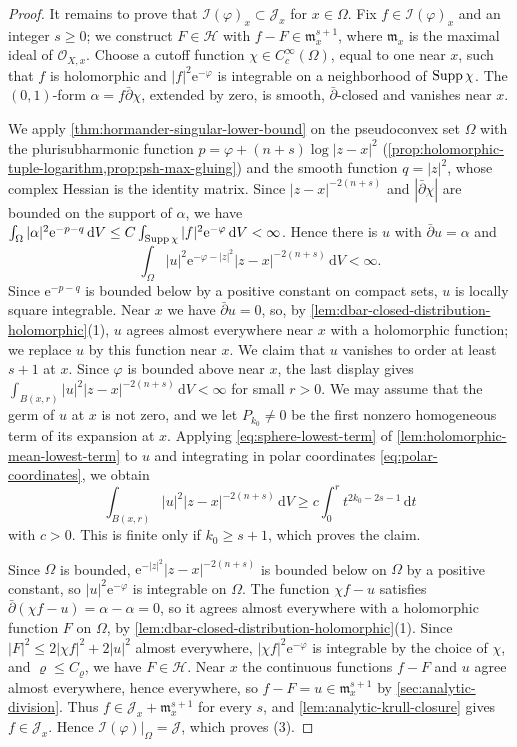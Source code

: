 \begin{proof}
It remains to prove that $\mathcal I(\varphi)_x\subset\mathcal J_x$ for $x\in\Omega$. Fix $f\in\mathcal I(\varphi)_x$ and an integer $s\geq0$; we construct $F\in\mathcal H$ with $f-F\in\mathfrak m_x^{s+1}$, where $\mathfrak m_x$ is the maximal ideal of $\mathcal O_{X,x}$. Choose a cutoff function $\chi\in C^\infty_c(\Omega)$, equal to one near $x$, such that $f$ is holomorphic and $|f|^2\mathrm e^{-\varphi}$ is integrable on a neighborhood of $\operatorname{Supp}\chi$. The $(0,1)$-form $\alpha=f\bar\partial\chi$, extended by zero, is smooth, $\bar\partial$-closed and vanishes near $x$.

We apply \cref{thm:hormander-singular-lower-bound} on the pseudoconvex set $\Omega$ with the plurisubharmonic function $p=\varphi+(n+s)\log|z-x|^2$ (\cref{prop:holomorphic-tuple-logarithm,prop:psh-max-gluing}) and the smooth function $q=|z|^2$, whose complex Hessian is the identity matrix. Since $|z-x|^{-2(n+s)}$ and $|\bar\partial\chi|$ are bounded on the support of $\alpha$, we have $\int_\Omega|\alpha|^2\mathrm e^{-p-q}\,\mathrm dV\leq C\int_{\operatorname{Supp}\chi}|f|^2\mathrm e^{-\varphi}\,\mathrm dV<\infty$. Hence there is $u$ with $\bar\partial u=\alpha$ and
\[
 \int_\Omega |u|^2\mathrm e^{-\varphi-|z|^2}|z-x|^{-2(n+s)}\,\mathrm dV<\infty.
\]
Since $\mathrm e^{-p-q}$ is bounded below by a positive constant on compact sets, $u$ is locally square integrable. Near $x$ we have $\bar\partial u=0$, so, by \cref{lem:dbar-closed-distribution-holomorphic}(1), $u$ agrees almost everywhere near $x$ with a holomorphic function; we replace $u$ by this function near $x$. We claim that $u$ vanishes to order at least $s+1$ at $x$. Since $\varphi$ is bounded above near $x$, the last display gives $\int_{B(x,r)}|u|^2|z-x|^{-2(n+s)}\,\mathrm dV<\infty$ for small $r>0$. We may assume that the germ of $u$ at $x$ is not zero, and we let $P_{k_0}\neq0$ be the first nonzero homogeneous term of its expansion at $x$. Applying \eqref{eq:sphere-lowest-term} of \cref{lem:holomorphic-mean-lowest-term} to $u$ and integrating in polar coordinates \eqref{eq:polar-coordinates}, we obtain
\[
 \int_{B(x,r)}|u|^2|z-x|^{-2(n+s)}\,\mathrm dV\geq c\int_0^rt^{2k_0-2s-1}\,\mathrm dt
\]
with $c>0$. This is finite only if $k_0\geq s+1$, which proves the claim.

Since $\Omega$ is bounded, $\mathrm e^{-|z|^2}|z-x|^{-2(n+s)}$ is bounded below on $\Omega$ by a positive constant, so $|u|^2\mathrm e^{-\varphi}$ is integrable on $\Omega$. The function $\chi f-u$ satisfies $\bar\partial(\chi f-u)=\alpha-\alpha=0$, so it agrees almost everywhere with a holomorphic function $F$ on $\Omega$, by \cref{lem:dbar-closed-distribution-holomorphic}(1). Since $|F|^2\leq2|\chi f|^2+2|u|^2$ almost everywhere, $|\chi f|^2\mathrm e^{-\varphi}$ is integrable by the choice of $\chi$, and $\varrho\leq C_\varrho$, we have $F\in\mathcal H$. Near $x$ the continuous functions $f-F$ and $u$ agree almost everywhere, hence everywhere, so $f-F=u\in\mathfrak m_x^{s+1}$ by \cref{sec:analytic-division}. Thus $f\in\mathcal J_x+\mathfrak m_x^{s+1}$ for every $s$, and \cref{lem:analytic-krull-closure} gives $f\in\mathcal J_x$. Hence $\mathcal I(\varphi)|_\Omega=\mathcal J$, which proves (3).


\end{proof}
